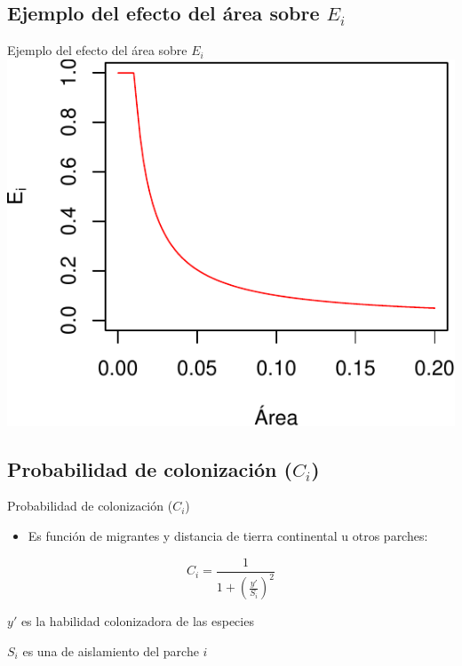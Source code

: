 \documentclass[
  11pt,
  ignorenonframetext,
]{beamer}
\providecommand{\tightlist}{%
  \setlength{\itemsep}{0pt}\setlength{\parskip}{0pt}}
\begin{document}
\hypertarget{ejemplo-del-efecto-del-uxe1rea-sobre-e_i}{%
\subsection{\texorpdfstring{Ejemplo del efecto del área sobre
\(E_i\)}{Ejemplo del efecto del área sobre E\_i}}\label{ejemplo-del-efecto-del-uxe1rea-sobre-e_i}}

\begin{frame}{Ejemplo del efecto del área sobre \(E_i\)}
\includegraphics{Hanski_files/figure-beamer/unnamed-chunk-4-1.pdf}
\end{frame}

\hypertarget{probabilidad-de-colonizaciuxf3n-c_i}{%
\subsection{\texorpdfstring{Probabilidad de colonización
(\(C_i\))}{Probabilidad de colonización (C\_i)}}\label{probabilidad-de-colonizaciuxf3n-c_i}}

\begin{frame}{Probabilidad de colonización (\(C_i\))}
\begin{itemize}
\tightlist
\item
  Es función de migrantes y distancia de tierra continental u otros
  parches:
\end{itemize}

\[C_i = \frac{1}{1 + \left(\frac{y'}{S_i}\right)^2}\]

\(y'\) es la habilidad colonizadora de las especies

\(S_i\) es una de aislamiento del parche \(i\)
\end{frame}
\end{document}
